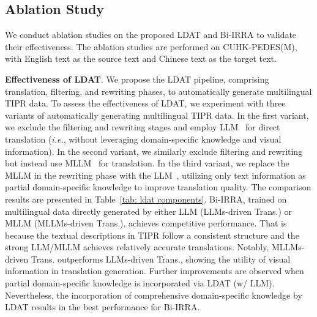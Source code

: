 \documentclass[10pt,journal,compsoc]{IEEEtran}
\begin{document}



\subsection{Ablation Study}
We conduct ablation studies on the proposed LDAT and Bi-IRRA to validate their effectiveness. The ablation studies are performed on CUHK-PEDES(M), with English text as the source text and Chinese text as the target text.



\textbf{Effectiveness of LDAT}.
We propose the LDAT pipeline, comprising translation, filtering, and rewriting phases, to automatically generate multilingual TIPR data.
To assess the effectiveness of LDAT, we experiment with three variants of automatically generating multilingual TIPR data.
In the first variant, we exclude the filtering and rewriting stages and employ LLM~\cite{dubey2024llama} for direct translation (\emph{i.e.}, without leveraging domain-specific knowledge and visual information).
In the second variant, we similarly exclude filtering and rewriting but instead use MLLM~\cite{bai2023qwenvl} for translation.
In the third variant, we replace the MLLM in the rewriting phase with the LLM~\cite{bai2023qwen, dubey2024llama}, utilizing only text information as partial domain-specific knowledge to improve translation quality.
The comparison results are presented in Table~\ref{tab: ldat components}. 
Bi-IRRA, trained on multilingual data directly generated by either LLM (LLMs-driven Trans.) or MLLM (MLLMs-driven Trans.), achieves competitive performance. That is because the textual descriptions in TIPR follow a consistent structure and the strong LLM/MLLM achieves relatively accurate translations. Notably, MLLMs-driven Trans. outperforms LLMs-driven Trans., showing the utility of visual information in translation generation.
Further improvements are observed when partial domain-specific knowledge is incorporated via LDAT (w/ LLM).
Nevertheless, the incorporation of comprehensive domain-specific knowledge by LDAT results in the best performance for Bi-IRRA.

\end{document}

